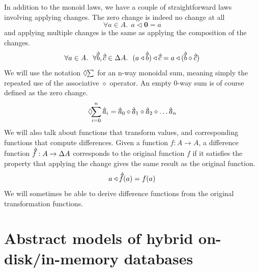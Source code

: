 \documentclass[11pt,a4paper]{article}
\newcommand\deltavar[1]{\accentset{\Delta}{#1}}
\begin{document}
In addition to the monoid laws, we have a couple of straightforward laws involving
applying changes. The zero change is indeed no change at all
\begin{equation}
  \forall a \in A. ~~ a \triangleleft \mathbf{0} = a
\end{equation}
and applying multiple changes is the same as applying the composition of the
changes.
\begin{equation}
\label{eq:apply-compose}
  \forall a \in A. ~~ \forall \deltavar{b}, \deltavar{c} \in \Delta{A}. ~~
    (a \triangleleft \deltavar{b}) \triangleleft \deltavar{c}
  = a \triangleleft (\deltavar{b} \diamond \deltavar{c})
\end{equation}
We will use the notation $\Diamond\hspace{-3pt}\sum$ for an n-way monoidal sum,
meaning simply the repeated use of the associative $\diamond$ operator. An empty
0-way sum is of course defined as the zero change.
\[
\Diamond\hspace{-4pt}\sum_{i=0}^n{\deltavar{a}_i}
= \deltavar{a}_0 \diamond \deltavar{a}_1 \diamond \deltavar{a}_2 \diamond \ldots \deltavar{a}_n
\]
We will also talk about functions that transform values, and corresponding
functions that compute differences. Given a function $f : A \to A$, a
difference function $\deltavar{f} : A \to \Delta{A}$ corresponds to the
original function $f$ if it satisfies the property that applying the change
gives the same result as the original function.
\begin{equation}
  a \triangleleft \deltavar{f}(a) = f(a)
\end{equation}
We will sometimes be able to derive difference functions from the original
transformation functions.


\section{Abstract models of hybrid on-disk/in-memory databases}
\label{abstract-models}
\end{document}
